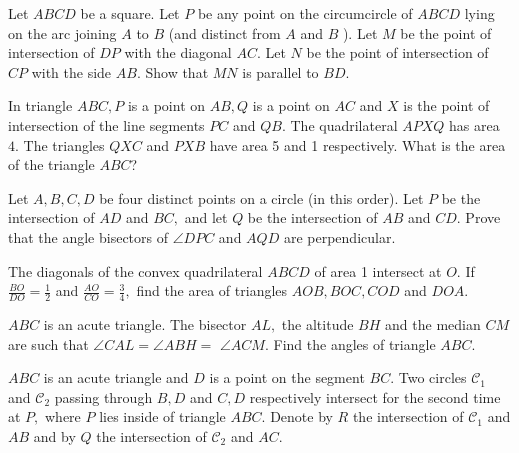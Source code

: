 \documentclass{pset}
\begin{document}
\begin{problems}
\begin{problem}
    Let \(A B C D\) be a square. Let \(P\) be any point on the circumcircle of \(A B C D\) lying on the arc joining \(A\) to \(B\) (and distinct from \(A\) and \(B\) ). Let \(M\) be the point of intersection of \(D P\) with the diagonal \(A C .\) Let \(N\) be the point of intersection of \(C P\) with the side \(A B .\) Show that \(M N\) is parallel to \(B D .\)
\end{problem}

\begin{problem}
    In triangle \(A B C, P\) is a point on \(A B, Q\) is a point on \(A C\) and \(X\) is the point of intersection of the line segments \(P C\) and \(Q B .\) The quadrilateral \(A P X Q\) has area \(4 .\) The triangles \(Q X C\) and \(P X B\) have area 5 and 1 respectively. What
    is the area of the triangle \(A B C\)?
\end{problem}

\begin{problem}
    Let \(A, B, C, D\) be four distinct points on a circle (in this order). Let \(P\) be the intersection of \(A D\) and
    \(B C,\) and let \(Q\) be the intersection of \(A B\) and \(C D .\) Prove that the angle bisectors of \(\angle D P C\) and \(A Q D\) are perpendicular.
\end{problem}

\begin{problem}
    The diagonals of the convex quadrilateral \(A B C D\) of area 1 intersect at \(O .\) If \(\frac{B O}{D O}=\frac{1}{2}\) and \(\frac{A O}{C O}=\frac{3}{4},\) find the area of triangles \(A O B, B O C, C O D\) and \(D O A\).
\end{problem}

\begin{problem}
    \(A B C\) is an acute triangle. The bisector \(A L,\) the altitude \(B H\) and the median \(C M\) are such that \(\angle C A L=\angle A B H=\) \(\angle A C M .\) Find the angles of triangle \(A B C\).
\end{problem}

\begin{problem}
    \(A B C\) is an acute triangle and \(D\) is a point on the segment \(B C .\) Two circles \(\mathcal{C}_{1}\) and \(\mathcal{C}_{2}\) passing through \(B, D\) and \(C, D\) respectively intersect for the second time at \(P,\) where \(P\) lies inside of triangle \(A B C .\) Denote by \(R\) the intersection of \(\mathcal{C}_{1}\) and \(A B\) and by \(Q\) the intersection of \(\mathcal{C}_{2}\) and \(A C\). 
    

\end{problem}
\end{problems}
\end{document}
